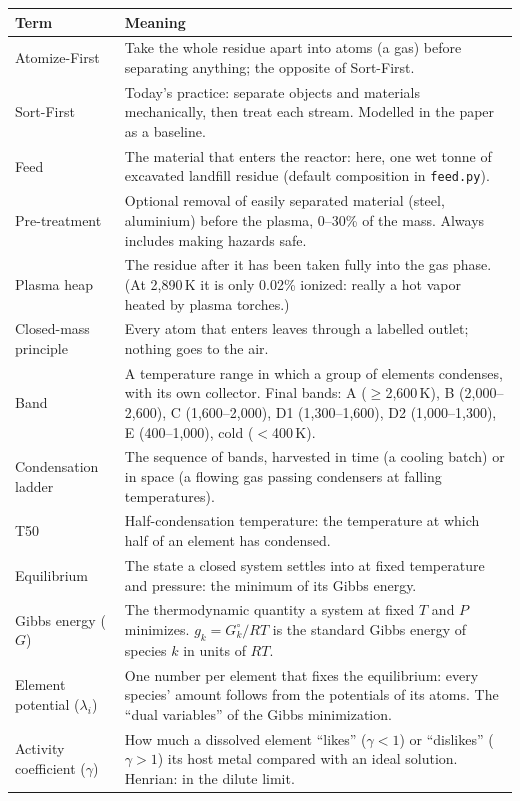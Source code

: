 \documentclass[11pt,a4paper]{article}
\begin{document}
\begin{longtable}{@{}>{\raggedright\arraybackslash}p{3.6cm}>{\raggedright\arraybackslash}p{11.2cm}@{}}
\toprule
\textbf{Term} & \textbf{Meaning} \\
\midrule
\endhead
Atomize-First & Take the whole residue apart into atoms (a gas) before separating anything; the opposite of Sort-First. \\
Sort-First & Today's practice: separate objects and materials mechanically, then treat each stream. Modelled in the paper as a baseline. \\
Feed & The material that enters the reactor: here, one wet tonne of excavated landfill residue (default composition in \texttt{feed.py}). \\
Pre-treatment & Optional removal of easily separated material (steel, aluminium) before the plasma, 0--30\% of the mass. Always includes making hazards safe. \\
Plasma heap & The residue after it has been taken fully into the gas phase. (At 2,890\,K it is only 0.02\% ionized: really a hot vapor heated by plasma torches.) \\
Closed-mass principle & Every atom that enters leaves through a labelled outlet; nothing goes to the air. \\
Band & A temperature range in which a group of elements condenses, with its own collector. Final bands: A ($\ge$2,600\,K), B (2,000--2,600), C (1,600--2,000), D1 (1,300--1,600), D2 (1,000--1,300), E (400--1,000), cold ($<$400\,K). \\
Condensation ladder & The sequence of bands, harvested in time (a cooling batch) or in space (a flowing gas passing condensers at falling temperatures). \\
T50 & Half-condensation temperature: the temperature at which half of an element has condensed. \\
Equilibrium & The state a closed system settles into at fixed temperature and pressure: the minimum of its Gibbs energy. \\
Gibbs energy ($G$) & The thermodynamic quantity a system at fixed $T$ and $P$ minimizes. $g_k = G^\circ_k/RT$ is the standard Gibbs energy of species $k$ in units of $RT$. \\
Element potential ($\lambda_i$) & One number per element that fixes the equilibrium: every species' amount follows from the potentials of its atoms. The ``dual variables'' of the Gibbs minimization. \\
Activity coefficient ($\gamma$) & How much a dissolved element ``likes'' ($\gamma<1$) or ``dislikes'' ($\gamma>1$) its host metal compared with an ideal solution. Henrian: in the dilute limit. \\

\end{longtable}
\end{document}
